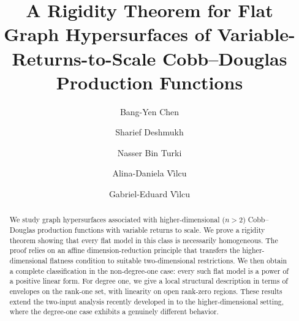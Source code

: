 \documentclass[12pt]{amsart}
\begin{document}
\title[A Rigidity Theorem for Flat Graph Hypersurfaces]{A Rigidity Theorem for Flat Graph Hypersurfaces of Variable-Returns-to-Scale Cobb--Douglas Production Functions}

\author[B.-Y. Chen]{Bang-Yen Chen}


\address{Department of Mathematics, Michigan State University,
                619 Red Cedar Road,
                East Lansing, 48824-1027 MI, USA}

\author[S. Deshmukh]{Sharief Deshmukh}


\address{Department of Mathematics, College of Science, King Saud
University,
P.O. Box 2455,
11451 Riyadh,
Saudi Arabia}

\author[N.B. Turki]{Nasser Bin Turki}


\address{Department of Mathematics, College of Science, King Saud
University,
P.O. Box 2455,
11451 Riyadh,
Saudi Arabia}

\author[A.-D. V\^{\i}lcu]{Alina-Daniela V\^{\i}lcu}

\address{Department of Computer Science, Information Technology, Mathematics and Physics, Petroleum-Gas University of Ploie\c{s}ti,
                Bd. Bucure\c{s}ti 39,
                 100680 Ploie\c{s}ti,
                Romania}

\author[G.-E. V\^{\i}lcu]{Gabriel-Eduard V\^{\i}lcu}


\address{"Gheorghe Mihoc-Caius Iacob" Institute of Mathematical Statistics
and Applied Mathematics of the Romanian Academy,
Calea 13 Septembrie 13,
050711 Bucharest,
Romania}

\address{Department of Mathematics and Informatics, National University of Science and Technology Politehnica Bucharest,
                313 Splaiul Independen\c{t}ei,
                 060042 Bucharest, Romania}

\begin{abstract}

We study graph hypersurfaces associated with
higher-dimensional ($n>2$) Cobb--Douglas production functions with
variable returns to scale. We prove a rigidity theorem showing that
every flat model in this class is necessarily homogeneous. The proof relies on an affine
dimension-reduction principle that transfers the higher-dimensional
flatness condition to suitable two-dimensional restrictions. We then
obtain a complete classification in the non-degree-one case: every
such flat model is a power of a positive linear form. For degree one,
we give a local structural description in terms of envelopes on the
rank-one set, with linearity on open rank-zero regions. These results
extend the two-input analysis recently developed in
\cite{Previous2D} to the higher-dimensional setting, where the
degree-one case exhibits a genuinely different behavior.
\end{abstract}
\end{document}
